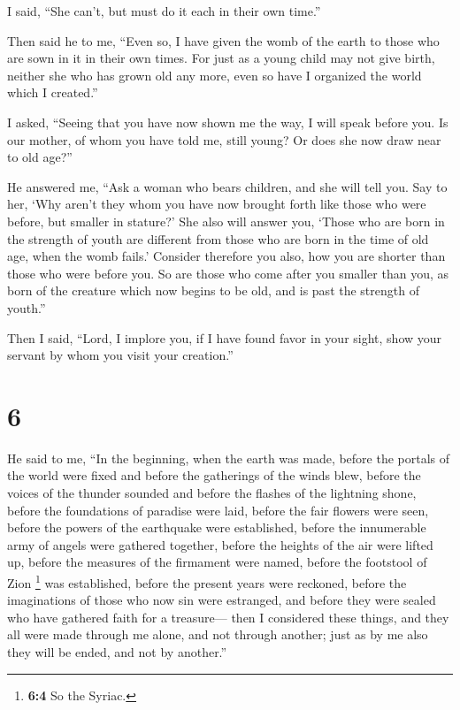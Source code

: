  I said, ``She can't, but must do it each in their own
time.''

 Then said he to me, ``Even so, I have given the womb of
the earth to those who are sown in it in their own times.
 For just as a young child may not give birth, neither
she who has grown old any more, even so have I organized the world which
I created.''

 I asked, ``Seeing that you have now shown me the way, I
will speak before you. Is our mother, of whom you have told me, still
young? Or does she now draw near to old age?''

 He answered me, ``Ask a woman who bears children, and
she will tell you.  Say to her, `Why aren't they whom you
have now brought forth like those who were before, but smaller in
stature?'  She also will answer you, `Those who are born
in the strength of youth are different from those who are born in the
time of old age, when the womb fails.'  Consider
therefore you also, how you are shorter than those who were before you.
 So are those who come after you smaller than you, as
born of the creature which now begins to be old, and is past the
strength of youth.''

 Then I said, ``Lord, I implore you, if I have found
favor in your sight, show your servant by whom you visit your
creation.''

\hypertarget{section-5}{%
\section{6}\label{section-5}}

 He said to me, ``In the beginning, when the earth was
made, before the portals of the world were fixed and before the
gatherings of the winds blew,  before the voices of the
thunder sounded and before the flashes of the lightning shone, before
the foundations of paradise were laid,  before the fair
flowers were seen, before the powers of the earthquake were established,
before the innumerable army of angels were gathered together,
 before the heights of the air were lifted up, before the
measures of the firmament were named, before the footstool of Zion
\footnote{\textbf{6:4} So the Syriac.} was established, 
before the present years were reckoned, before the imaginations of those
who now sin were estranged, and before they were sealed who have
gathered faith for a treasure---  then I considered these
things, and they all were made through me alone, and not through
another; just as by me also they will be ended, and not by another.''

